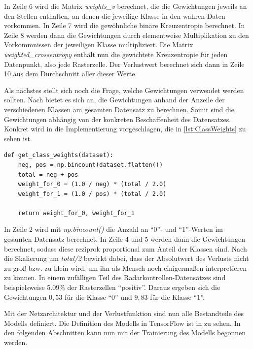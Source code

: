 In Zeile 6 wird die Matrix \emph{weights\_v} berechnet, die die Gewichtungen jeweils an den Stellen enthalten, an denen die jeweilige Klasse in den wahren Daten vorkommen.
In Zeile 7 wird die gewöhnliche binäre Kreuzentropie berechnet.
In Zeile 8 werden dann die Gewichtungen durch elementweise Multiplikation zu den Vorkommnissen der jeweiligen Klasse multipliziert.
Die Matrix \emph{weighted\_crossentropy} enthält nun die gewichtete Kreuzentropie für jeden Datenpunkt, also jede Rasterzelle.
Der Verlustwert berechnet sich dann in Zeile 10 aus dem Durchschnitt aller dieser Werte.

Als nächstes stellt sich noch die Frage, welche Gewichtungen verwendet werden sollten.
Nach \cite{KerasImbalancedData} bietet es sich an, die Gewichtungen anhand der Anzeile der verschiedenen Klassen am gesamten Datensatz zu berechnen.
Somit sind die Gewichtungen abhängig von der konkreten Beschaffenheit des Datensatzes.
Konkret wird in \cite{KerasImbalancedData} die Implementierung vorgeschlagen, die in \autoref{lst:ClassWeights} zu sehen ist.

\begin{code}
\begin{verbatim}
def get_class_weights(dataset):
    neg, pos = np.bincount(dataset.flatten())
    total = neg + pos
    weight_for_0 = (1.0 / neg) * (total / 2.0)
    weight_for_1 = (1.0 / pos) * (total / 2.0)

    return weight_for_0, weight_for_1
\end{verbatim}
\label{lst:ClassWeights}
\end{code}

In Zeile 2 wird mit \emph{np.bincount()} die Anzahl an "`0"'- und "`1"'-Werten im gesamten Datensatz berechnet.
In Zeile 4 und 5 werden dann die Gewichtungen berechnet, sodass diese reziprok proportional zum Anteil der Klassen sind.
Nach die Skalierung um \emph{total/2} bewirkt dabei, dass der Absolutwert des Verlusts nicht zu groß bzw. zu klein wird, um ihn als Mensch noch einigermaßen interpretieren zu können.
In einem zufälligen Teil des Radarkontrollen-Datensatzes sind beispielsweise 5.09\% der Rasterzellen "`positiv"'.
Daraus ergeben sich die Gewichtungen $0,53$ für die Klasse "`0"' und $9,83$ für die Klasse "`1"'.

Mit der Netzarchitektur und der Verlustfunktion sind nun alle Bestandteile des Modells definiert.
Die Definition des Modells in TensorFlow ist in  zu sehen.
In den folgenden Abschnitten kann nun mit der Trainierung des Modells begonnen werden.

